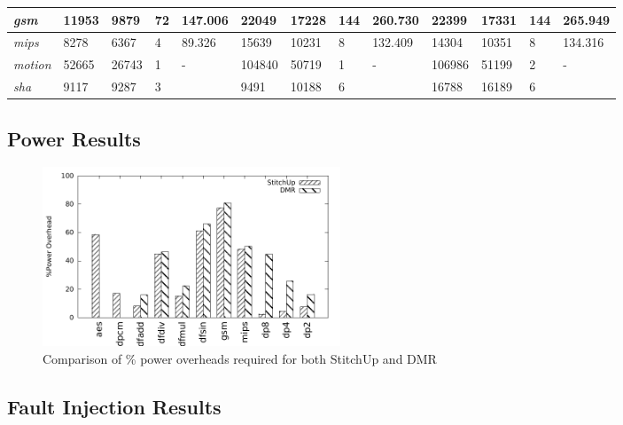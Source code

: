 \begin{table}[t]
\begin{tabular}{@{}|l|l|l|l|l|l|l|l|l|l|l|l|l|@{}}
\textit{gsm}        & 11953        & 9879         & 72           & 147.006        & 22049        & 17228        & 144          & 260.730        & 22399        & 17331        & 144          & 265.949        \\ \midrule
\textit{mips}       & 8278         & 6367         & 4            & 89.326         & 15639        & 10231        & 8            & 132.409        & 14304        & 10351        & 8            & 134.316        \\ \midrule
\textit{motion}     & 52665        & 26743        & 1            & -              & 104840       & 50719        & 1            & -              & 106986       & 51199        & 2            & -              \\ \midrule
\textit{sha}        & 9117         & 9287         & 3            &                & 9491         & 10188        & 6            &                & 16788        & 16189        & 6            &                \\ \bottomrule
\end{tabular}
\end{table}

\subsection{Power Results}
\begin{figure}[h]
\centering
\includegraphics[width=3.5in]{./graphs/power_results.pdf}
\caption{Comparison of \% power overheads required for both StitchUp and DMR}
\label{fig:power_res}
\end{figure}


\subsection{Fault Injection Results}

